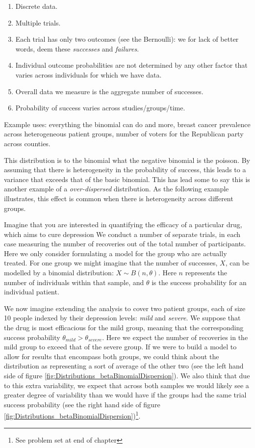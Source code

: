 \documentclass[11pt,fullpage]{book}
\begin{document}
\begin{enumerate} 
\item Discrete data.
\item Multiple trials.
\item Each trial has only two outcomes (see the Bernoulli): we for lack of better words, deem these \textit{successes} and \textit{failures}.
\item Individual outcome probabilities are not determined by any other factor that varies across individuals for which we have data.
\item Overall data we measure is the aggregate number of successes. 
\item Probability of success varies across studies/groups/time.
\end{enumerate}

Example uses: everything the binomial can do and more, breast cancer prevalence across heterogeneous patient groups, number of voters for the Republican party across counties.

This distribution is to the binomial what the negative binomial is the poisson. By assuming that there is heterogeneity in the probability of success, this leads to a variance that exceeds that of the basic binomial. This has lead some to say this is another example of a \textit{over-dispersed} distribution. As the following example illustrates, this effect is common when there is heterogeneity across different groups. 

Imagine that you are interested in quantifying the efficacy of a particular drug, which aims to cure depression We conduct a number of separate trials, in each case measuring the number of recoveries out of the total number of participants. Here we only consider formulating a model for the group who are actually treated. For one group we might imagine that the number of successes, $X$, can be modelled by a binomial distribution: $X\sim B(n,\theta)$. Here $n$ represents the number of individuals within that sample, and $\theta$ is the success probability for an individual patient.

We now imagine extending the analysis to cover two patient groups, each of size 10 people indexed by their depression levels: \textit{mild} and \textit{severe}. We suppose that the drug is most efficacious for the mild group, meaning that the corresponding success probability $\theta_{mild}> \theta_{severe}$. Here we expect the number of recoveries in the mild group to exceed that of the severe group. If we were to build a model to allow for results that encompass both groups, we could think about the distribution as representing a sort of average of the other two (see the left hand side of figure \ref{fig:Distributions_betaBinomialDispersion}). We also think that due to this extra variability, we expect that across both samples we would likely see a greater degree of variability than we would have if the groups had the same trial success probability (see the right hand side of figure \ref{fig:Distributions_betaBinomialDispersion})\footnote{See problem set at end of chapter}. 
\end{document}
